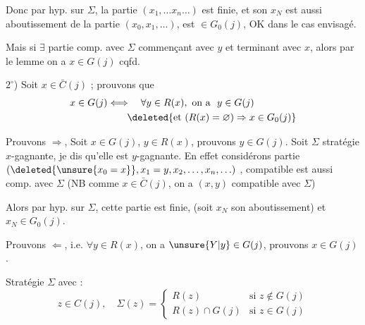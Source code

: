 Donc par hyp. sur $\Sigma$, la partie $(x_1,\ldots x_n\ldots)$ est finie,  et son   $x_N$  est aussi aboutissement de la partie $(x_0,x_1,\ldots)$, est $\in G_0(j)$,  OK dans le cas envisagé.

Mais si $\exists$ partie comp. avec $\Sigma$ commençant avec $y$ et terminant avec $x$, alors par le lemme on a  $x\in G(j)$ cqfd.

$2^\circ$) Soit $x\in\bar C(j)$ ; prouvons que
\[
\begin{aligned}
x\in G(j)&\Longleftrightarrow\quad\forall y\in R(x),\ \text{on a }\ y\in G(j)\\
&\qquad\deleted{\text{et }(R(x)=\varnothing)\Rightarrow x\in G_0(j)}
\end{aligned}
\]



Prouvons $\Longrightarrow$, Soit $x\in G(j)$, $y\in R(x)$, prouvons $y\in G(j)$. Soit $\Sigma$ stratégie  $x$-gagnante, je dis qu'elle est $y$-gagnante. En effet considérons  partie $(\deleted{\unsure{x_0=x}},x_1=y,x_2,\ldots,x_n,\ldots)$ , compatible   est aussi comp. avec $\Sigma$ (NB comme $x\in\bar C(j)$, on a $(x,y)$ compatible avec $\Sigma$)

Alors par hyp. sur $\Sigma$, cette partie est finie, (soit $x_N$ son aboutissement) et $x_N\in G_0(j)$.   


Prouvons $\Longleftarrow$, i.e.  $\forall y\in R(x)$, on a $\unsure{Y|y}\in G(j)$, prouvons $x\in G(j)$.

Stratégie $\Sigma$ avec :
\[
z\in C(j),\quad \Sigma(z)=
\begin{cases}
 R(z)&\text{si }z\notin G(j)\\
 R(z)\cap G(j)&\text{si }z\in G(j)
\end{cases}
\]

